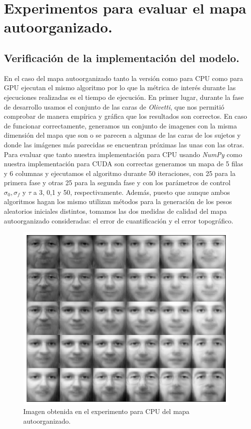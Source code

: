\section{Experimentos para evaluar el mapa autoorganizado.}
\subsection{Verificación de la implementación del modelo.}
En el caso del mapa autoorganizado tanto la versión como para CPU como para GPU ejecutan el mismo algoritmo por lo que la métrica de interés durante las ejecuciones realizadas es el tiempo de ejecución. En primer lugar, durante la fase de desarrollo usamos el conjunto de las caras de \textit{Olivetti}, que nos permitió comprobar de manera empírica y gráfica que los resultados son correctos. En caso de funcionar correctamente, generamos un conjunto de imagenes con la misma dimensión del mapa que son o se parecen a algunas de las caras de los sujetos y donde las imágenes más parecidas se encuentran próximas las unas con las otras. \\

Para evaluar que tanto nuestra implementación para CPU usando \textit{NumPy} como nuestra implementación para CUDA son correctas generamos un mapa de 5 filas y 6 columnas y ejecutamos el algoritmo durante 50 iteraciones, con 25 para la primera fase y otras 25 para la segunda fase y con los parámetros de control $\sigma_0, \sigma_f$ y $\tau$ a 3, 0,1 y 50, respectivamente. Además, puesto que aunque ambos algoritmos hagan los mismo utilizan métodos para la generación de los pesos aleatorios iniciales distintos, tomamos las dos medidas de calidad del mapa autoorganizado consideradas: el error de cuantificación y el error topográfico.\\

\begin{figure}[ht]
\centering
\includegraphics[scale=0.3]{imagenes/facescpu.png}
\caption{Imagen obtenida en el experimento para CPU del mapa autoorganizado.}
\label{img:somcpu}
\end{figure}

